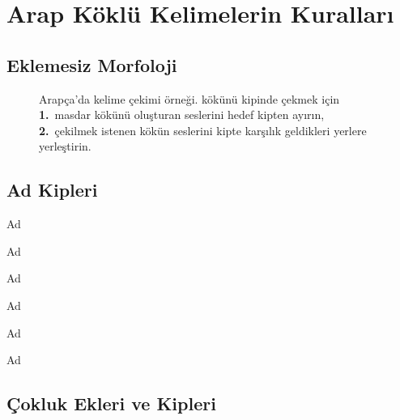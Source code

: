 
\chapter{Arap Köklü Kelimelerin Kuralları}

\section{Eklemesiz Morfoloji}

\begin{figure}[htbp]
  \centering
  
  \caption{Arapça'da kelime çekimi örneği.
    \fmtkok{\Lnun\Lvav\Lre} kökünü
     kipinde çekmek için \textbf{1.}\ masdar kökünü oluşturan \masdarkok
    seslerini hedef kipten ayırın, \textbf{2.}\ çekilmek istenen kökün seslerini
    kipte karşılık geldikleri yerlere yerleştirin.}
  \label{fig:fig2}
\end{figure}

\section{Ad Kipleri}

\begin{kip}{}{Ad}
\end{kip}

\begin{kip}{}{Ad}
\end{kip}

\begin{kip}{}{Ad}
\end{kip}

\begin{kip}{}{Ad}
\end{kip}

\begin{kip}{}{Ad}
\end{kip}

\begin{kip}{}{Ad}
\end{kip}





\section{Çokluk Ekleri ve Kipleri}


